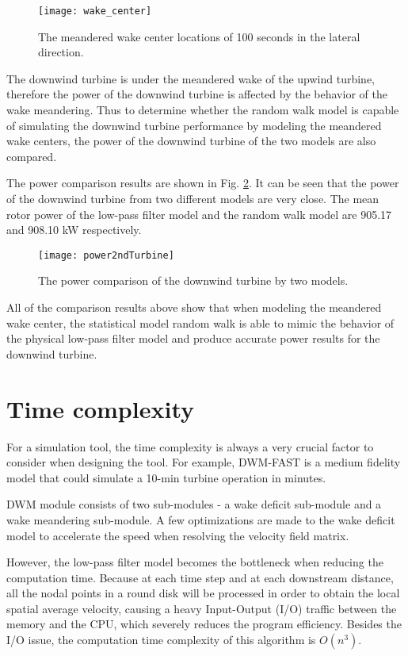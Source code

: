 \documentclass{umthesis}
\begin{document}
\begin{figure}
  \centering
  \texttt{[image: wake\_center]}
  \caption{The meandered wake center locations of 100 seconds in the lateral direction.}\label{fig:wake_center_compare}
\end{figure}

The downwind turbine is under the meandered wake of the upwind turbine, therefore the power of the downwind turbine is affected by the behavior of the wake meandering. Thus to determine whether the random walk model is capable of simulating the downwind turbine performance by modeling the meandered wake centers, the power of the downwind turbine of the two models are also compared. 

The power comparison results are shown in Fig. \ref{fig:rw_power_compare}. It can be seen that the power of the downwind turbine from two different models are very close. The mean rotor power of the low-pass filter model and the random walk model are 905.17 and 908.10 kW respectively.

\begin{figure}
  \centering
  \texttt{[image: power2ndTurbine]}
  \caption{The power comparison of the downwind turbine by two models.}\label{fig:rw_power_compare}
\end{figure}

All of the comparison results above show that when modeling the meandered wake center, the statistical model random walk is able to mimic the behavior of the physical low-pass filter model and produce accurate power results for the downwind turbine.

\section{Time complexity}\label{sec:timeComplexity}
For a simulation tool, the time complexity is always a very crucial factor to consider when designing the tool. For example, DWM-FAST is a medium fidelity model that could simulate a 10-min turbine operation in minutes.

DWM module consists of two sub-modules - a wake deficit sub-module and a wake meandering sub-module. A few optimizations are made to the wake deficit model to accelerate the speed when resolving the velocity field matrix. 

However, the low-pass filter model becomes the bottleneck when reducing the computation time. Because at each time step and at each downstream distance, all the nodal points in a round disk will be processed in order to obtain the local spatial average velocity, causing a heavy Input-Output (I/O) traffic between the memory and the CPU, which severely reduces the program efficiency. Besides the I/O issue, the computation time complexity of this algorithm is $O(n^3)$.
\end{document}
